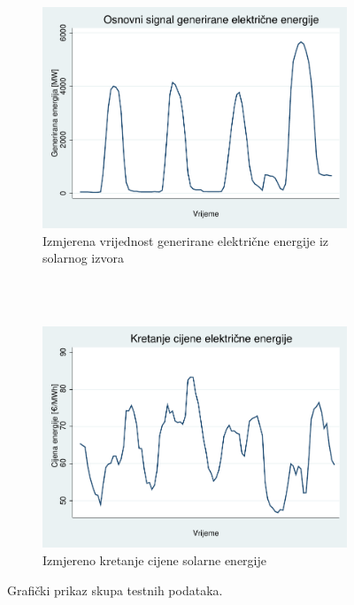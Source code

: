 \documentclass[a4paper,12pt,oneside]{memoir}
\begin{document}
        \begin{figure}[H]
            \centering
            \begin{subfigure}[b] {0.6\linewidth}
                \centering
                \includegraphics[width=\textwidth]{graphs/solar_graph.pdf}
                \caption{Izmjerena vrijednost generirane električne energije iz solarnog izvora}
                \label{fig:solar_graph}
            \end{subfigure}
            \\~\\
            \begin{subfigure}[b] {0.6\linewidth}
                \centering
                \includegraphics[width=\textwidth]{graphs/price_graph.pdf}
                \caption{Izmjereno kretanje cijene solarne energije}      
                \label{fig:price_graph}
            \end{subfigure}
            \caption{Grafički prikaz skupa testnih podataka.}
            \label{fig:solar_price}    
        \end{figure}
\end{document}
